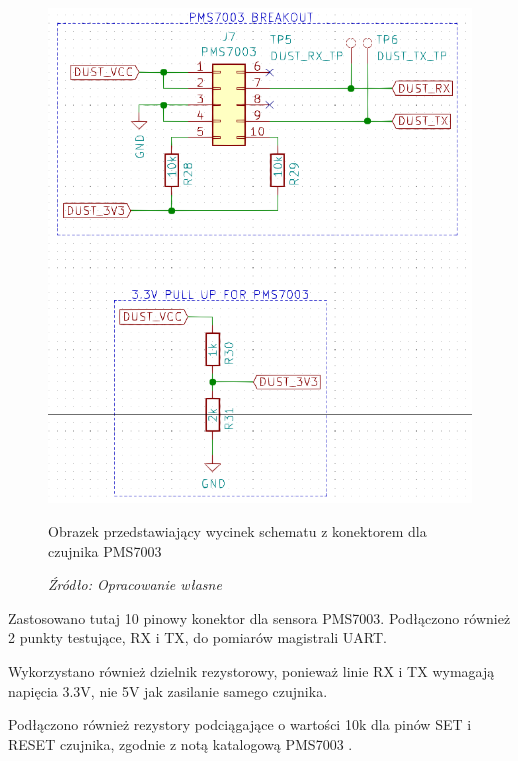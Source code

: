 \documentclass[12pt,a4paper,oneside]{memoir}
\begin{document}
\begin{figure}[!h]
	\centering
	\includegraphics[scale=0.3]{images/sch/sch-12.png}
	{\tytulyrozdzialow \footnotesize \caption[Schemat - konektor dla PMS7003] {Obrazek przedstawiający wycinek schematu z konektorem dla czujnika PMS7003}}
	\caption*{\textit{Źródło: Opracowanie własne}}
\end{figure}
\par Zastosowano tutaj 10 pinowy konektor dla sensora PMS7003. Podłączono również 2 punkty testujące, RX i TX, do pomiarów magistrali UART.
\par Wykorzystano również dzielnik rezystorowy, ponieważ linie RX i TX wymagają napięcia 3.3V, nie 5V jak zasilanie samego czujnika.
\par Podłączono również rezystory podciągające o wartości 10k dla pinów SET i RESET czujnika, zgodnie z notą katalogową PMS7003 \cite{pms7003datasheet}.
\end{document}
